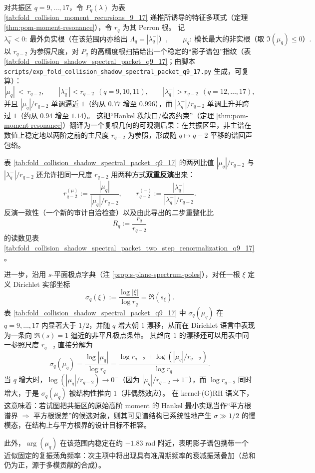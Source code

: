 \begin{remark}\label{rem:pom-shadow-spectral-packet-q9-17}
对共振区 \(q=9,\dots,17\)，令 \(P_q(\lambda)\) 为表 \ref{tab:fold_collision_moment_recursions_9_17} 递推所诱导的特征多项式（定理 \ref{thm:pom-moment-resonance}），令 \(r_q\) 为其 Perron 根。
记
\[
\lambda_q^-<0:\ \text{最外负实根（在该范围内亦给出 }\Lambda_q=|\lambda_q^-|\text{）},
\qquad
\mu_q:\ \text{模长最大的非实根（取 }\Im(\mu_q)\le 0\text{）}.
\]
以 \(r_{q-2}\) 为参照尺度，对 \(P_q\) 的高精度根扫描给出一个稳定的“影子谱包”指纹（表 \ref{tab:fold_collision_shadow_spectral_packet_q9_17}；由脚本 \texttt{scripts/exp\_fold\_collision\_shadow\_spectral\_packet\_q9\_17.py} 生成，可复算）：
\[
|\mu_q|\ <\ r_{q-2},
\qquad
|\lambda_q^-|<r_{q-2}\ \ (q=9,10,11),
\qquad
|\lambda_q^-|>r_{q-2}\ \ (q=12,\dots,17),
\]
并且 \(|\mu_q|/r_{q-2}\) 单调逼近 \(1\)（约从 \(0.77\) 增至 \(0.996\)），而 \(|\lambda_q^-|/r_{q-2}\) 单调上升并跨过 \(1\)（约从 \(0.94\) 增至 \(1.14\)）。
这把“Hankel 秩缺口/模态约束”（定理 \ref{thm:pom-moment-resonance}）翻译为一个复根几何的可观测后果：在共振区里，非主谱在数值上稳定地以两阶之前的主尺度 \(r_{q-2}\) 为参照，形成随 \(q\mapsto q-2\) 平移的谱回声包络。
\par
表 \ref{tab:fold_collision_shadow_spectral_packet_q9_17} 的两列比值
\(
|\mu_q|/r_{q-2}
\)
与
\(
|\lambda_q^-|/r_{q-2}
\)
还允许把同一尺度 \(r_{q-2}\) 用两种方式\textbf{双重反演}出来：
\[
r_{q-2}^{(\mu)}:=\frac{|\mu_q|}{|\mu_q|/r_{q-2}},
\qquad
r_{q-2}^{(-)}:=\frac{|\lambda_q^-|}{|\lambda_q^-|/r_{q-2}}.
\]
反演一致性（一个新的审计自洽检查）以及由此导出的二步重整化比
\[
\boxed{\ R_q:=\frac{r_q}{r_{q-2}}\ }
\]
的读数见表 \ref{tab:fold_collision_shadow_spectral_packet_two_step_renormalization_q9_17}。
\par
进一步，沿用 \(s\)-平面极点字典（注 \ref{prop:s-plane-spectrum-poles}），对任一根 \(\xi\) 定义 Dirichlet 实部坐标
\[
\sigma_q(\xi):=\frac{\log|\xi|}{\log r_q}=\Re(s_\xi).
\]
表 \ref{tab:fold_collision_shadow_spectral_packet_q9_17} 中 \(\sigma_q(\mu_q)\) 在 \(q=9,\dots,17\) 内显著大于 \(1/2\)，并随 \(q\) 增大朝 \(1\) 漂移，从而在 Dirichlet 语言中表现为一条向 \(\Re(s)=1\) 逼近的非平凡极点条带。
其趋向 \(1\) 的漂移还可以用表中同一参照尺度 \(r_{q-2}\) 直接分解为
\[
\sigma_q(\mu_q)=\frac{\log|\mu_q|}{\log r_q}
=\frac{\log r_{q-2}+\log(|\mu_q|/r_{q-2})}{\log r_q}.
\]
当 \(q\) 增大时，\(\log(|\mu_q|/r_{q-2})\to 0^{-}\)（因为 \(|\mu_q|/r_{q-2}\to 1^{-}\)），而 \(\log r_{q-2}\) 同时增大，于是 \(\sigma_q(\mu_q)\) 被结构性推向 \(1\)（非偶然效应）。
在 kernel-(G)RH 语义下，这意味着：若试图把共振区的原始高阶 moment 的 Hankel 最小实现当作“平方根谱界 \(\Rightarrow\) 平方根误差”的候选对象，则其可见谱结构已系统性地产生 \(\sigma\gg 1/2\) 的慢模态，在结构上与平方根界的设计目标不相容。
\par
此外，\(\arg(\mu_q)\) 在该范围内稳定在约 \(-1.83\) rad 附近，表明影子谱包携带一个近似固定的复振荡角频率：次主项中将出现具有准周期频率的衰减振荡叠加（总和仍为正，源于多模贡献的合成）。
\par

\end{remark}
